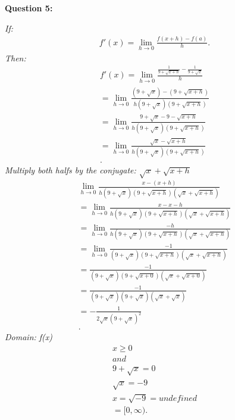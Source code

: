 \documentclass{report}
\begin{document}
    \bigbreak \noindent \bigbreak \noindent \bigbreak \noindent 
    \begin{Large}
        \textbf{Question 5:}
    \end{Large}
    \bigbreak \noindent 
    \bigbreak \noindent 
    \textit{If:}
    \begin{align*}
      f\prime(x) = \lim\limits_{h \to 0}{ \frac{f(x+h) - f(a)}{h}}
    .\end{align*}
    \bigbreak \noindent 
    \textit{Then:}
    \begin{align*}
      f\prime(x) = \lim\limits_{h \to 0}{ \frac{ \frac{1}{9 + \sqrt{x+h}} - \frac{1}{9+ \sqrt{x}}}{h}} \\ 
      = \lim\limits_{h \to 0}{ \frac{(9+ \sqrt{x})-(9+ \sqrt{x+h})}{h(9+ \sqrt{x})(9+ \sqrt{x+h})}} \\ 
      = \lim\limits_{h \to 0}{ \frac{9+ \sqrt{x} -9- \sqrt{x+h}}{h(9+ \sqrt{x})(9+ \sqrt{x+h})}} \\ 
      = \lim\limits_{h \to 0}{ \frac{ \sqrt{x} - \sqrt{x+h}}{h(9+ \sqrt{x})(9+ \sqrt{x+h})}} \\ 
    .\end{align*}
    \textit{Multiply both halfs by the conjugate: $ \sqrt{x} + \sqrt{x+h}$} 
    \begin{align*}
      \lim\limits_{h \to 0}{ \frac{x-(x+h)}{h(9+ \sqrt{x})(9+ \sqrt{x+h})( \sqrt{x} + \sqrt{x+h})}} \\ 
      = \lim\limits_{h \to 0}{ \frac{x-x-h}{h(9+ \sqrt{x})(9+ \sqrt{x+h})( \sqrt{x} + \sqrt{x+h})}} \\ 
      = \lim\limits_{h \to 0}{ \frac{-h}{h(9+ \sqrt{x})(9+ \sqrt{x+h})( \sqrt{x} + \sqrt{x+h})}} \\
      = \lim\limits_{h \to 0}{ \frac{-1}{(9+ \sqrt{x})(9+ \sqrt{x+h})( \sqrt{x} + \sqrt{x+h})}} \\
      = \frac{-1}{(9+ \sqrt{x})(9+ \sqrt{x+0})( \sqrt{x} + \sqrt{x+0})} \\
      = \frac{-1}{(9+ \sqrt{x})(9+ \sqrt{x})( \sqrt{x} + \sqrt{x})} \\
      = -\frac{1}{2\sqrt{x}(9+ \sqrt{x})^2} \\
    .\end{align*}
    \bigbreak \noindent 
    \textit{Domain: f(x)}
    \begin{align*}
        x \geq 0 \\ 
        and\ \\ 
        9 + \sqrt{x} = 0 \\
        \sqrt{x} = -9 \\
        x = \sqrt{-9} = undefined \\
        = [0, \infty) 
    .\end{align*}
\end{document}
